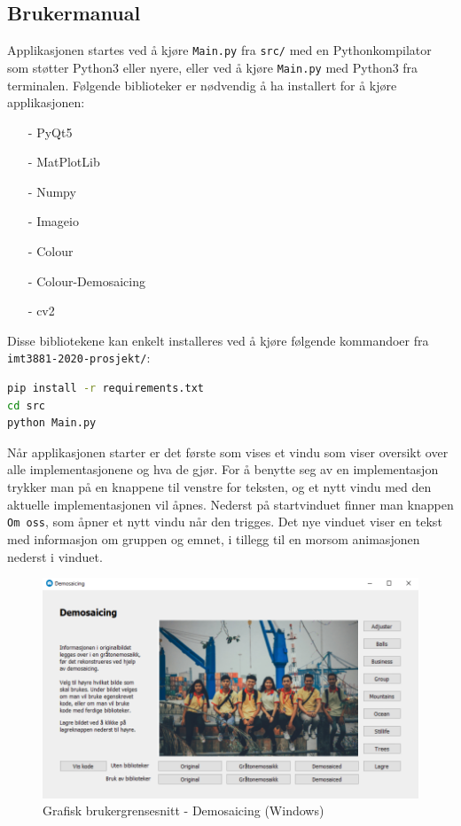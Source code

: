 \subsection{Brukermanual}
Applikasjonen startes ved å kjøre \texttt{Main.py} fra \texttt{src/} med en Pythonkompilator som støtter Python3 eller nyere, eller ved å kjøre \texttt{Main.py} med Python3 fra terminalen. Følgende biblioteker er nødvendig å ha installert for å kjøre applikasjonen:
\begin{itemize}[noitemsep,topsep=0pt,parsep=0pt,partopsep=0pt]
  \item[-] PyQt5
  \item[-] MatPlotLib
  \item[-] Numpy
  \item[-] Imageio
  \item[-] Colour
  \item[-] Colour-Demosaicing
  \item[-] cv2
\end{itemize}
Disse bibliotekene kan enkelt installeres ved å kjøre følgende kommandoer fra \texttt{imt3881-2020-prosjekt/}:
\begin{lstlisting}[language=Bash]
pip install -r requirements.txt
cd src
python Main.py
\end{lstlisting}
Når applikasjonen starter er det første som vises et vindu som viser oversikt over alle implementasjonene og hva de gjør. For å benytte seg av en implementasjon trykker man på en knappene til venstre for teksten, og et nytt vindu med den aktuelle implementasjonen vil åpnes. Nederst på startvinduet finner man knappen \texttt{Om oss}, som åpner et nytt vindu når den trigges. Det nye vinduet viser en tekst med informasjon om gruppen og emnet, i tillegg til en morsom animasjonen nederst i vinduet.
\begin{figure}[H]
\begin{center}
    \includegraphics[width=0.9\columnwidth]{bilder/Gui/DemosaicingGuiExample.png}
     \caption{Grafisk brukergrensesnitt - Demosaicing (Windows) \label{fig:guiexample3}}
\end{center}
\end{figure}

